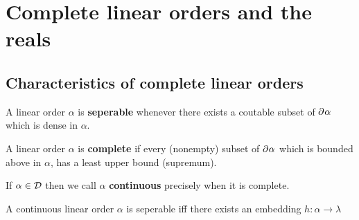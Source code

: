 
\chapter{Complete linear orders and the reals}

\section{Characteristics of complete linear orders}

\begin{dfn}[Separable]
	A linear order $\alpha$ is \textbf{seperable} whenever there exists a coutable subset of $\partial^{}{}\alpha$ which is dense in $\alpha$.
\end{dfn}

\begin{dfn}[Completeness]
	A linear order $\alpha$ is \textbf{complete} if every (nonempty) subset of $\partial^{}{\alpha}$ which is bounded above in $\alpha$, has a least upper bound (supremum).
\end{dfn}

\begin{dfn}
	If $\alpha\in\mathcal{D}$ then we call $\alpha$ \textbf{continuous} precisely when it is complete.
\end{dfn}

\begin{prp}[Seperability]\label{prp:sep}
	A continuous linear order $\alpha$ is seperable iff there exists an embedding $h\colon\alpha\to\lambda$
\end{prp}

